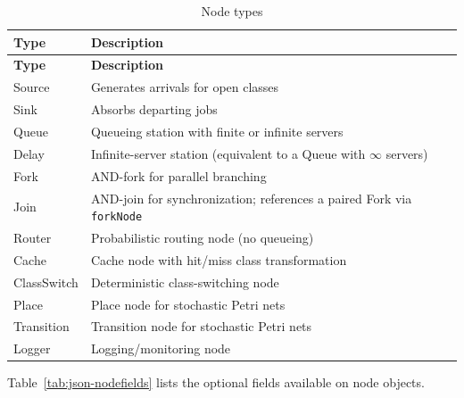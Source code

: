 \begin{footnotesize}
\begin{longtable}{|T{2.5cm}|D{10.4cm}|}
\caption{Node types}\label{tab:json-nodetypes}
\\\hline
\textbf{Type} & \textbf{Description} \\\hline
\endfirsthead
\hline \textbf{Type} & \textbf{Description} \\\hline
\endhead
\hline
\endfoot
Source      & Generates arrivals for open classes \\\hline
Sink        & Absorbs departing jobs \\\hline
Queue       & Queueing station with finite or infinite servers \\\hline
Delay       & Infinite-server station (equivalent to a Queue with $\infty$ servers) \\\hline
Fork        & AND-fork for parallel branching \\\hline
Join        & AND-join for synchronization; references a paired Fork via \texttt{forkNode} \\\hline
Router      & Probabilistic routing node (no queueing) \\\hline
Cache       & Cache node with hit/miss class transformation \\\hline
ClassSwitch & Deterministic class-switching node \\\hline
Place       & Place node for stochastic Petri nets \\\hline
Transition  & Transition node for stochastic Petri nets \\\hline
Logger      & Logging/monitoring node \\\hline
\end{longtable}
\end{footnotesize}

Table~\ref{tab:json-nodefields} lists the optional fields available on node objects.

